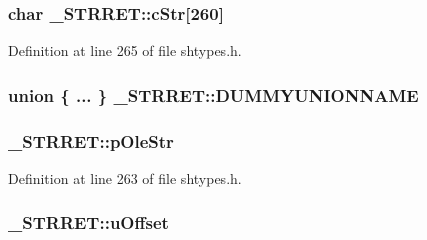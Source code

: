 \subsubsection[{\texorpdfstring{c\+Str}{cStr}}]{\setlength{\rightskip}{0pt plus 5cm}char \+\_\+\+S\+T\+R\+R\+E\+T\+::c\+Str\mbox{[}260\mbox{]}}\hypertarget{struct___s_t_r_r_e_t_a57660bf5e69abd73ac6cd3026bae8a5c}{}\label{struct___s_t_r_r_e_t_a57660bf5e69abd73ac6cd3026bae8a5c}


Definition at line 265 of file shtypes.\+h.

\subsubsection[{\texorpdfstring{D\+U\+M\+M\+Y\+U\+N\+I\+O\+N\+N\+A\+ME}{DUMMYUNIONNAME}}]{\setlength{\rightskip}{0pt plus 5cm}union \{ ... \}  	 \+\_\+\+S\+T\+R\+R\+E\+T\+::\+D\+U\+M\+M\+Y\+U\+N\+I\+O\+N\+N\+A\+ME}\hypertarget{struct___s_t_r_r_e_t_a5fcf27241ecb01de8d7d85a6784dbbfc}{}\label{struct___s_t_r_r_e_t_a5fcf27241ecb01de8d7d85a6784dbbfc}
\subsubsection[{\texorpdfstring{p\+Ole\+Str}{pOleStr}}]{ \+\_\+\+S\+T\+R\+R\+E\+T\+::p\+Ole\+Str}\hypertarget{struct___s_t_r_r_e_t_a59bd1cc8e0ca27db45ebcbf56df47a9f}{}\label{struct___s_t_r_r_e_t_a59bd1cc8e0ca27db45ebcbf56df47a9f}


Definition at line 263 of file shtypes.\+h.

\subsubsection[{\texorpdfstring{u\+Offset}{uOffset}}]{ \+\_\+\+S\+T\+R\+R\+E\+T\+::u\+Offset}\hypertarget{struct___s_t_r_r_e_t_a8a7b1ee859627c50194532b63f604972}{}\label{struct___s_t_r_r_e_t_a8a7b1ee859627c50194532b63f604972}


